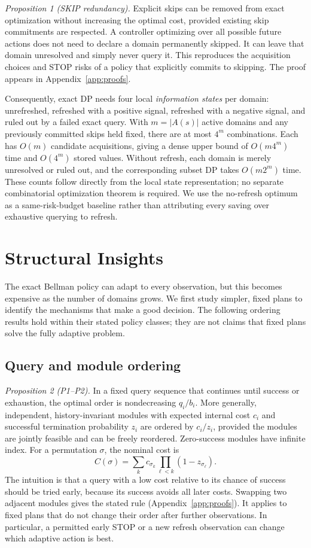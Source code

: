 \documentclass[conference]{IEEEtran}
\begin{document}
\textit{Proposition 1 (SKIP redundancy).} Explicit skips can be removed from exact optimization without increasing the optimal cost, provided existing skip commitments are respected.
A controller optimizing over all possible future actions does not need to declare a domain permanently skipped. It can leave that domain unresolved and simply never query it. This reproduces the acquisition choices and STOP risks of a policy that explicitly commits to skipping. The proof appears in Appendix~\ref{app:proofs}.

Consequently, exact DP needs four local \emph{information states} per domain: unrefreshed, refreshed with a positive signal, refreshed with a negative signal, and ruled out by a failed exact query. With $m=|A(s)|$ active domains and any previously committed skips held fixed, there are at most $4^m$ combinations. Each has $O(m)$ candidate acquisitions, giving a dense upper bound of $O(m4^m)$ time and $O(4^m)$ stored values. Without refresh, each domain is merely unresolved or ruled out, and the corresponding subset DP takes $O(m2^m)$ time. These counts follow directly from the local state representation; no separate combinatorial optimization theorem is required. We use the no-refresh optimum as a same-risk-budget baseline rather than attributing every saving over exhaustive querying to refresh.

\section{Structural Insights}
\label{sec:structural}
The exact Bellman policy can adapt to every observation, but this becomes expensive as the number of domains grows. We first study simpler, fixed plans to identify the mechanisms that make a good decision. The following ordering results hold within their stated policy classes; they are not claims that fixed plans solve the fully adaptive problem.

\subsection{Query and module ordering}
\textit{Proposition 2 (P1--P2).} In a fixed query sequence that continues until success or exhaustion, the optimal order is nondecreasing $q_i/b_i$. More generally, independent, history-invariant modules with expected internal cost $c_i$ and successful termination probability $z_i$ are ordered by $c_i/z_i$, provided the modules are jointly feasible and can be freely reordered. Zero-success modules have infinite index. For a permutation $\sigma$, the nominal cost is
\begin{equation}
 C(\sigma)=\sum_{k}c_{\sigma_k}\prod_{\ell<k}(1-z_{\sigma_\ell}).
 \label{eq:modulecost}
\end{equation}
The intuition is that a query with a low cost relative to its chance of success should be tried early, because its success avoids all later costs. Swapping two adjacent modules gives the stated rule (Appendix~\ref{app:proofs}). It applies to fixed plans that do not change their order after further observations. In particular, a permitted early STOP or a new refresh observation can change which adaptive action is best.
\end{document}
